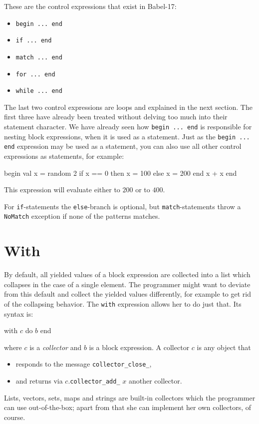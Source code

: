 \documentclass[11pt]{amsart}
\newcommand{\babelsrc}[1] {\lstinline!#1!}
\begin{document}
These are the control expressions that exist in Babel-17:
\begin{itemize}
\item \babelsrc{begin ... end}
\item \babelsrc{if ... end}
\item \babelsrc{match ... end}
\item \babelsrc{for ... end}
\item \babelsrc{while ... end}
\end{itemize}
The last two control expressions are loops and explained in the next section. The first three have already been treated without delving too much into their statement character. We have already seen how  \babelsrc{begin ... end} is responsible for nesting block expressions, when it is used as a statement.  Just as  the \babelsrc{begin ... end} expression may be used as a statement, 
you can also use all other control expressions as statements, for example:
\begin{babellisting}
begin
  val x = random 2
  if x == 0 then
    x = 100
  else
    x = 200
  end
  x + x
end
\end{babellisting}
This expression will evaluate either to $200$ or to $400$.

For \babelsrc{if}-statements the \babelsrc{else}-branch is optional, but \babelsrc{match}-statements throw a \babelsrc{NoMatch} exception if none of the patterns matches. 

\section{With}
By default, all yielded values of a block expression are collected into a list which collapses in the case of a single element. The programmer might want to deviate from this default and collect the yielded values differently, for example to get rid of the collapsing behavior. The \babelsrc{with} expression allows her to do just that. Its syntax is:
\begin{babellisting}
with $c$ do 
  $b$
end
\end{babellisting}
where $c$ is a \emph{collector} and $b$ is a block expression. A collector $c$ is any object that 
\begin{itemize}
\item responds to the message \verb+collector_close_+,
\item and returns via $c$.\verb+collector_add_+ $x$ another collector.
\end{itemize}
Lists, vectors, sets, maps and strings are built-in collectors which the programmer can use out-of-the-box; apart from that she can implement her own collectors, of course.
\end{document}
